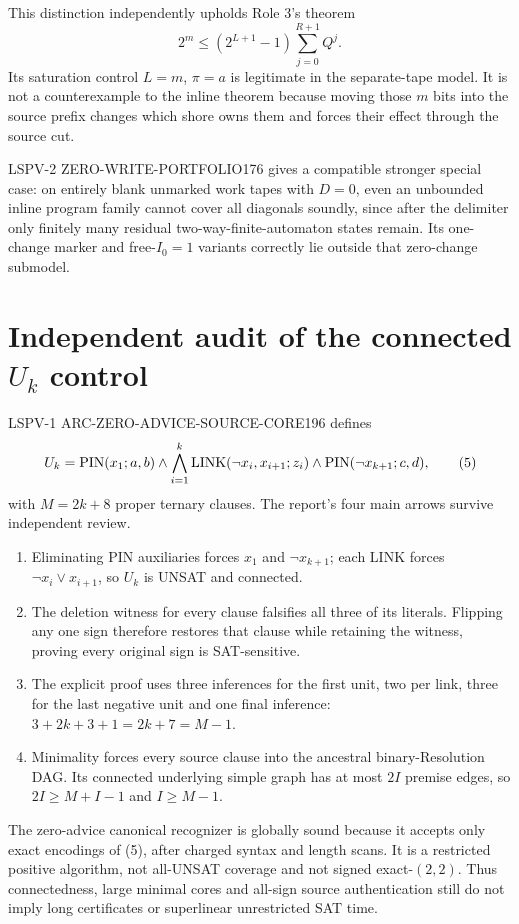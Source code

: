 \documentclass[11pt]{article}
\begin{document}
This distinction independently upholds Role 3's theorem
\[
2^m\le(2^{L+1}-1)\sum_{j=0}^{R+1}Q^j.
\]
Its saturation control $L=m$, $\pi=a$ is legitimate in the separate-tape model.  It is not a counterexample to the inline theorem because moving those $m$ bits into the source prefix changes which shore owns them and forces their effect through the source cut.

LSPV-2 ZERO-WRITE-PORTFOLIO176 gives a compatible stronger special case: on entirely blank unmarked work tapes with $D=0$, even an unbounded inline program family cannot cover all diagonals soundly, since after the delimiter only finitely many residual two-way-finite-automaton states remain.  Its one-change marker and free-$I_0=1$ variants correctly lie outside that zero-change submodel.

\section{Independent audit of the connected $U_k$ control}
LSPV-1 ARC-ZERO-ADVICE-SOURCE-CORE196 defines
\[
U_k={\rm PIN}(x_1;a,b)\wedge
\bigwedge_{i=1}^k{\rm LINK}(\neg x_i,x_{i+1};z_i)
\wedge{\rm PIN}(\neg x_{k+1};c,d),                 \tag{5}
\]
with $M=2k+8$ proper ternary clauses.  The report's four main arrows survive independent review.
\begin{enumerate}
\item Eliminating PIN auxiliaries forces $x_1$ and $\neg x_{k+1}$; each LINK forces $\neg x_i\vee x_{i+1}$, so $U_k$ is UNSAT and connected.
\item The deletion witness for every clause falsifies all three of its literals.  Flipping any one sign therefore restores that clause while retaining the witness, proving every original sign is SAT-sensitive.
\item The explicit proof uses three inferences for the first unit, two per link, three for the last negative unit and one final inference: $3+2k+3+1=2k+7=M-1$.
\item Minimality forces every source clause into the ancestral binary-Resolution DAG.  Its connected underlying simple graph has at most $2I$ premise edges, so $2I\ge M+I-1$ and $I\ge M-1$.
\end{enumerate}
The zero-advice canonical recognizer is globally sound because it accepts only exact encodings of (5), after charged syntax and length scans.  It is a restricted positive algorithm, not all-UNSAT coverage and not signed exact-$(2,2)$.  Thus connectedness, large minimal cores and all-sign source authentication still do not imply long certificates or superlinear unrestricted SAT time.
\end{document}
